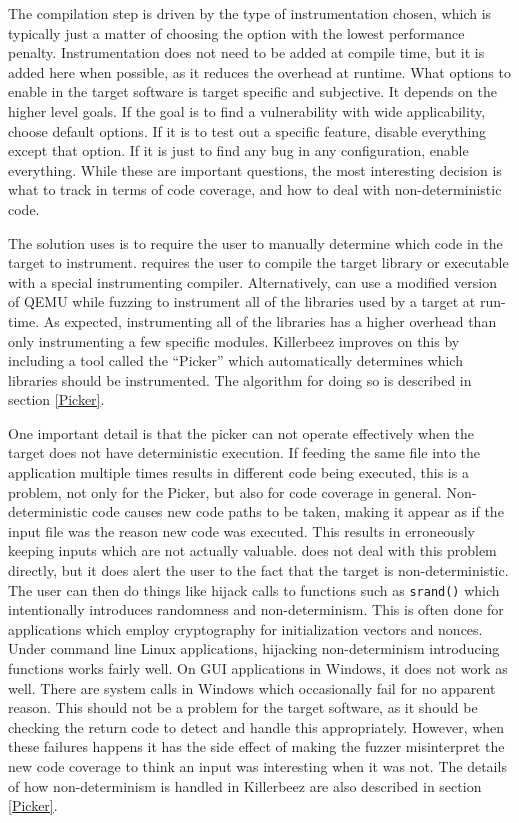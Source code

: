 The compilation step is driven by the type of instrumentation chosen,
which is typically just a matter of choosing the option with the lowest
performance penalty. Instrumentation does not need to be added at compile
time, but it is added here when possible, as it reduces the overhead at runtime.
What options to enable in the target software is target specific and
subjective.  It depends on the higher level goals.  If the goal is to find a
vulnerability with wide applicability, choose default options. If it is to test
out a specific feature, disable everything except that option. If it is just to
find any bug in any configuration, enable everything.  While these are
important questions, the most interesting decision is what to track in terms of
code coverage, and how to deal with non-deterministic code.

The solution \AFL{} uses is to require the user to manually determine which code
in the target to instrument. \AFL{} requires the user to compile the target library
or executable with a special instrumenting compiler. Alternatively, \AFL{} can
use a modified version of QEMU while fuzzing to instrument all of the libraries
used by a target at run-time.  As expected, instrumenting all of the libraries
has a higher overhead than only instrumenting a few specific modules. Killerbeez
improves on this by including a tool
called the ``Picker'' which automatically determines which libraries should be
instrumented.  The algorithm for doing so is described in section \ref{Picker}.

One important detail is that the picker can not operate effectively when the
target does not have deterministic execution.  If feeding the same file into
the application multiple times results in different code being executed, this
is a problem, not only for the Picker, but also for code coverage in general.
Non-deterministic code causes new code paths to be taken, making it appear as
if the input file was the reason new code was executed.  This results in
erroneously keeping inputs which are not actually valuable.
\AFL{} does not deal with this problem directly, but it does alert the user to
the fact that the target is non-deterministic. The user can then do things like
hijack calls to functions such as \texttt{srand()} which intentionally introduces
randomness and non-determinism. This is often done for applications which employ cryptography for
initialization vectors and nonces. Under command line Linux applications, hijacking non-determinism introducing functions
works fairly well.  On GUI applications in Windows, it does not work as well.
There are system calls in Windows which occasionally fail for no apparent reason. This
should not be a problem for the target software, as it should be checking the return code to
detect and handle this appropriately.  However, when these failures happens it has the
side effect of making the fuzzer misinterpret the new code coverage to think an input was interesting when it was
not.  The details of how non-determinism is handled in Killerbeez are also described in
section \ref{Picker}.

